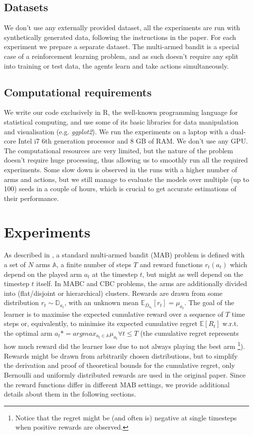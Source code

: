 \subsection{Datasets}

We don't use any externally provided dataset, all the experiments are run with synthetically generated data, following the instructions in the paper. For each experiment we prepare a separate dataset. The multi-armed bandit is a special case of a reinforcement learning problem, and as such doesn't require any split into training or test data, the agents learn and take actions simultaneously.

\subsection{Computational requirements}

We write our code exclusively in R, the well-known programming language for statistical computing, and use some of its basic libraries for data manipulation and visualisation (e.g. \emph{ggplot2}). We run the experiments on a laptop with a dual-core Intel i7 6th generation processor and 8 GB of RAM. We don't use any GPU. The computational resources are very limited, but the nature of the problem doesn't require huge processing, thus allowing us to smoothly run all the required experiments. Some slow down is observed in the runs with a higher number of arms and actions, but we still manage to evaluate the models over multiple (up to 100) seeds in a couple of hours, which is crucial to get accurate estimations of their performance.

\section{Experiments}
\label{sec:experiments}

As described in \cite{bandits}, a standard multi-armed bandit (MAB) problem is defined with a set of $N$ arms $\mathbb{A}$, a finite number of steps $T$ and reward functions $r_t(a_t)$ which depend on the played arm $a_t$ at the timestep $t$, but might as well depend on the timestep $t$ itself. In MABC and CBC problems, the arms are additionally divided into (flat/disjoint or hierarchical) clusters. Rewards are drawn from some distribution $r_t \sim \mathbb{D}_{a_t}$, with an unknown mean $\mathbb{E}_{D_{a_t}}[r_t] = \mu_{a_t}$. The goal of the learner is to maximise the expected cumulative reward over a sequence of $T$ time steps or, equivalently, to minimise its expected cumulative regret $\mathbb{E}[R_t]$ w.r.t. the optimal arm $a_t* = arg max_{a_t \in \mathbb{A}} \mu_{a_t} \forall t \leq T$ (the cumulative regret represents how much reward did the learner lose due to not always playing the best arm \footnote{Notice that the regret might be (and often is) negative at single timesteps when positive rewards are observed.}). Rewards might be drawn from arbitrarily chosen distributions, but to simplify the derivation and proof of theoretical bounds for the cumulative regret, only Bernoulli and uniformly distributed rewards are used in the original paper. Since the reward functions differ in different MAB settings, we provide additional details about them in the following sections. 

